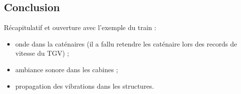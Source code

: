 \subsection*{Conclusion}

\begin{slide}
Récapitulatif et ouverture avec l'exemple du train :
\begin{itemize}
\item onde dans la caténaires (il a fallu retendre les caténaire lors des records de vitesse du TGV) ;
\item ambiance sonore dans les cabines ;
\item propagation des vibrations dans les structures.
\end{itemize}
\end{slide}

\newpage